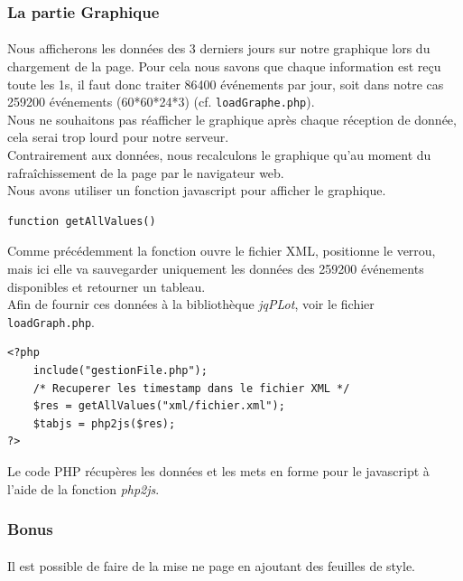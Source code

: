 \documentclass[a4paper, titlepage, oneside, 12pt]{article}%
\begin{document}
\subsubsection{La partie Graphique}
\paragraph{}
 Nous afficherons les données des 3 derniers jours sur notre graphique lors du chargement de la page. Pour cela nous savons que chaque information est reçu toute les 1s, il faut donc traiter 86400 événements par jour, soit dans notre cas 259200 événements (60*60*24*3) (cf. \texttt{loadGraphe.php}).\\
Nous ne souhaitons pas réafficher le graphique après chaque réception de donnée, cela serai trop lourd pour notre serveur.\\ Contrairement aux données, nous recalculons le graphique qu'au moment du rafraîchissement de la page par le navigateur web. \\
Nous avons utiliser un fonction javascript pour afficher le graphique.
\begin{lstlisting}
function getAllValues()
\end{lstlisting}
Comme précédemment la fonction ouvre le fichier XML, positionne le verrou, mais ici elle va sauvegarder uniquement les données des 259200 événements disponibles et retourner un tableau.\\
Afin de fournir ces données à la bibliothèque \textit{jqPLot}, voir le fichier \texttt{loadGraph.php}.
\begin{lstlisting}
<?php 
	include("gestionFile.php"); 
	/* Recuperer les timestamp dans le fichier XML */
	$res = getAllValues("xml/fichier.xml");
	$tabjs = php2js($res);
?>
\end{lstlisting}
Le code PHP récupères les données et les mets en forme pour le javascript à l'aide de la fonction \textit{php2js}.\\
\subsubsection{Bonus}
\paragraph{}
Il est possible de faire de la mise ne page en ajoutant des feuilles de style.
\end{document}
